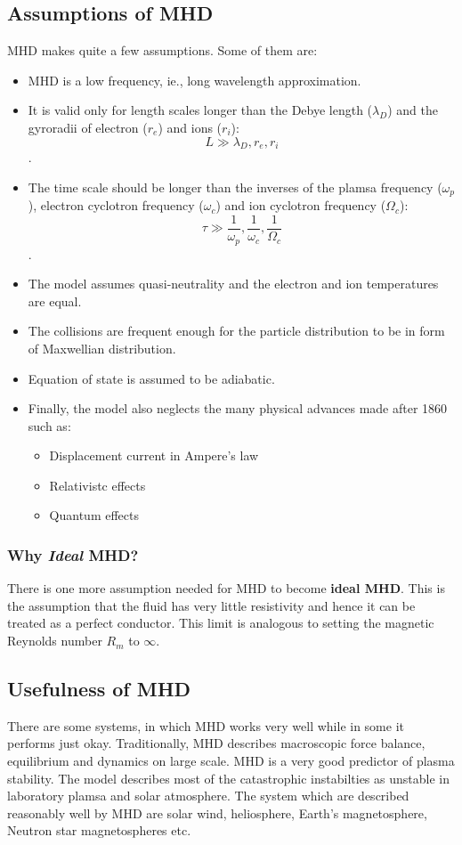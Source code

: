 \documentclass[12pt]{article}
\newenvironment{changemargin}[2]{%
\begin{list}{}{%
\setlength{\topsep}{0pt}%
\setlength{\leftmargin}{#1}%
\setlength{\rightmargin}{#2}%
\setlength{\listparindent}{\parindent}%
\setlength{\itemindent}{\parindent}%
\setlength{\parsep}{\parskip}%
}%
\item[]}{\end{list}}
\begin{document}
\begin{changemargin}{-2cm}{-2cm}
    \subsection{Assumptions of MHD}
    MHD makes quite a few assumptions. Some of them are\cite{article1}:
    \begin{itemize}
        \item MHD is a low frequency, ie., long wavelength approximation.
        \item It is valid only for length scales longer than the Debye length ($\lambda_D$) and the gyroradii of electron ($r_e$) and ions ($r_i$): $$ L \gg \lambda_D, r_e, r_i$$.
        \item The time scale should be longer than the inverses of the plamsa frequency ($\omega_p$), electron cyclotron frequency ($\omega_c$) and ion cyclotron frequency ($\Omega_{c}$): $$\tau \gg \frac{1}{\omega_p}, \frac{1}{\omega_c}, \frac{1}{\Omega_{c}}$$.
        \item The model assumes quasi-neutrality and the electron and ion temperatures are equal.
        \item The collisions are frequent enough for the particle distribution to be in form of Maxwellian distribution.
        \item Equation of state is assumed to be adiabatic.
        \item Finally, the model also neglects the many physical advances made after 1860 such as:
              \begin{itemize}
                  \item Displacement current in Ampere's law
                  \item Relativistc effects
                  \item Quantum effects
              \end{itemize}
    \end{itemize}

    \subsubsection{Why \textit{Ideal} MHD?}
    There is one more assumption needed for MHD to become \textbf{ideal MHD}. This is the assumption that the fluid has very little resistivity and hence it can be treated as a perfect conductor. This limit is analogous to setting the magnetic Reynolds number $R_m$ to $\infty$.

    \subsection{Usefulness of MHD}
    There are some systems, in which MHD works very well while in some it performs just okay. Traditionally, MHD describes macroscopic force balance, equilibrium and dynamics on large scale. MHD is a very good predictor of plasma stability. The model describes most of the catastrophic instabilties as unstable in laboratory plamsa and solar atmosphere. The system which are described reasonably well by MHD are solar wind, heliosphere, Earth's magnetosphere, Neutron star magnetospheres etc.


\end{changemargin}
\end{document}
